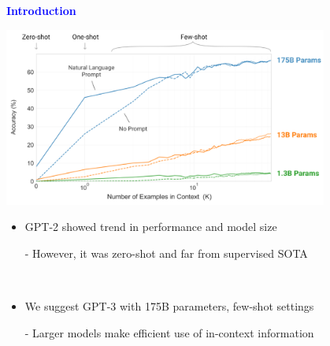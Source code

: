 \documentclass[professionalfont]{beamer}
\begin{document}
\begin{frame}
\begin{center}
    { \textbf{\textcolor{blue}{ {\fontsize{12}{14}\selectfont Introduction} }} }
\end{center}

\begin{center}
    \includegraphics[width=0.8\textwidth]{figure/1-2.png}
\end{center}

{\fontsize{10}{14}\selectfont 
\begin{itemize}
    \item GPT-2 showed trend in performance and model size
    
    - However, it was zero-shot and far from supervised SOTA

    \\[0.3cm]

    \item We suggest GPT-3 with 175B parameters, few-shot settings

    - Larger models make efficient use of in-context information
    
\end{itemize}
}

\end{frame}
\end{document}

